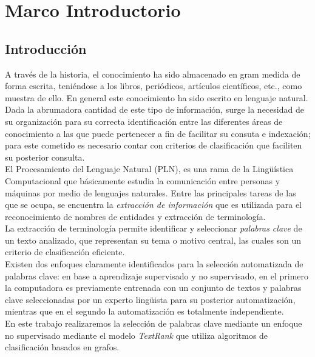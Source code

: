 \chapter{Marco Introductorio}
\section{Introducci\'on}
A trav\'es de la historia, el conocimiento ha sido almacenado en gram medida de forma
escrita, teni\'endose a los libros, peri\'odicos, art\'iculos cient\'ificos, etc.,
como muestra de ello. En general este conocimiento ha sido escrito en lenguaje
natural.\\

Dada la abrumadora cantidad de este tipo de informaci\'on, surge la necesidad de su
organizaci\'on para su correcta identificaci\'on entre las diferentes \'areas de
conocimiento a las que puede pertenecer a fin de facilitar su consuta e indexaci\'on;
para este cometido es necesario contar con criterios de clasificaci\'on que faciliten
su posterior consulta.\\

El Procesamiento del Lenguaje Natural (PLN), es una rama de la Ling\"u\'istica
Computacional que b\'asicamente estudia la comunicaci\'on entre personas y m\'aquinas
por medio de lenguajes naturales. Entre las principales tareas de las que se ocupa,
se encuentra la \emph{extracci\'on de informaci\'on} que es utilizada para el
reconocimiento de nombres de entidades y extracci\'on de terminolog\'ia. \\

La extracci\'on de terminolog\'ia permite identificar y seleccionar \emph{palabras
clave} de un texto analizado, que representan su tema o motivo central, las cuales
son un criterio de clasificaci\'on eficiente. \\

Existen dos enfoques claramente identificados para la selecci\'on automatizada de
palabras clave: en base a aprendizaje supervisado y no supervisado, en el primero
la computadora es previamente entrenada con un conjunto de textos y palabras clave
seleccionadas por un experto ling\"uista para su posterior automatizaci\'on, mientras
que en el segundo la automatizaci\'on es totalmente independiente. \\

En este trabajo realizaremos la selecci\'on de palabras clave mediante un enfoque
no supervisado mediante el modelo \emph{TextRank} que utiliza algoritmos de
clasificaci\'on basados en grafos.

